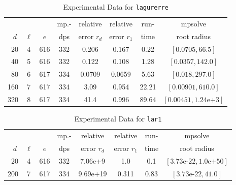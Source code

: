 \documentclass[runningheads]{llncs}
\begin{document}
\begin{table}
\caption{Experimental Data for \texttt{lagurerre}} %
\label{tab:lagurerre}
\vskip -0.15in
\begin{center}
\begin{small}
\begin{sc}
\begin{tabular}{rccccccc}
\toprule
&  &  & mp.-& relative  & relative & run- & mpsolve \\
$d~$& $\ell$& $e$ & dps&error $r_d$       & error $r_1$ &time& root radius\\
\midrule
 20 & 4 & 616 & 332 & 0.206 & 0.167 & 0.22 & $[0.0705, 66.5]$\\
 40 & 5 & 616 & 332 & 0.122 & 0.108 & 1.28 & $[0.0357, 142.0]$\\
 80 & 6 & 617 & 334 & 0.0709 & 0.0659 & 5.63 & $[0.018, 297.0]$\\
 160 & 7 & 617 & 334 & 3.09 & 0.954 & 22.21 & $[0.00901, 610.0]$\\
 320 & 8 & 617 & 334 & 41.4 & 0.996 & 89.64 & $[0.00451, 1.24\text{e+}3]$\\
\bottomrule
\end{tabular}
\end{sc}
\end{small}
\end{center}
\vskip 0.05in
\end{table}

\begin{table}
\caption{Experimental Data for \texttt{lar1}} %
\label{tab:lar1}
\vskip -0.15in
\begin{center}
\begin{small}
\begin{sc}
\begin{tabular}{rccccccc}
\toprule
&  &  & mp.-& relative  & relative & run- & mpsolve \\
$d~$& $\ell$& $e$ & dps&error $r_d$       & error $r_1$ &time& root radius\\
\midrule
 20 & 4 & 616 & 332 & 7.06e+9 & 1.0 & 0.1 & $[3.73\text{e-}22, 1.0\text{e+}50]$\\
 200 & 7 & 617 & 334 & 9.69e+19 & 0.311 & 0.83 & $[3.73\text{e-}22, 41.0]$\\
\bottomrule
\end{tabular}
\end{sc}
\end{small}
\end{center}
\vskip 0.05in
\end{table}
\end{document}
